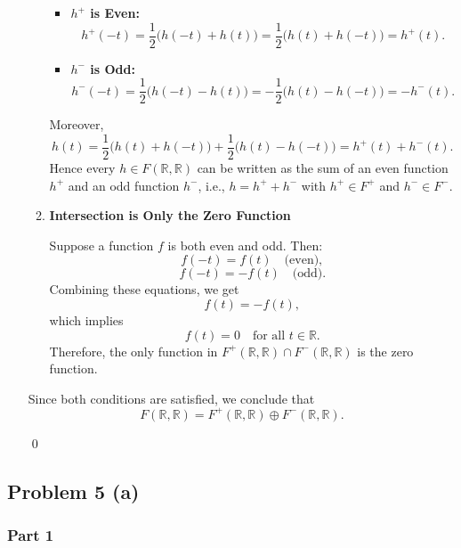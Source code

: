 \documentclass[12pt]{article}
\begin{document}
\begin{enumerate}[label=(\alph*)]
\begin{enumerate}[label=\arabic*.]
        \begin{itemize}
            \item \textbf{\(h^+\) is Even:}
            \[
                h^+(-t) = \frac{1}{2}\bigl(h(-t) + h(t)\bigr) = \frac{1}{2}\bigl(h(t) + h(-t)\bigr) = h^+(t).
            \]
            
            \item \textbf{\(h^-\) is Odd:}
            \[
                h^-(-t) = \frac{1}{2}\bigl(h(-t) - h(t)\bigr) = -\frac{1}{2}\bigl(h(t) - h(-t)\bigr) = -h^-(t).
            \]
        \end{itemize}
        
        Moreover,
        \[
            h(t) = \frac{1}{2}\bigl(h(t) + h(-t)\bigr) + \frac{1}{2}\bigl(h(t) - h(-t)\bigr) = h^+(t) + h^-(t).
        \]
        Hence every \(h \in F(\mathbb{R}, \mathbb{R})\) can be written as the sum of an even function \(h^+\) and an odd function \(h^-\), i.e., \(h = h^+ + h^-\) with \(h^+ \in F^+\) and \(h^- \in F^-\).
        
        \item \textbf{Intersection is Only the Zero Function}
        
        Suppose a function \(f\) is both even and odd. Then:
        \[
            f(-t) = f(t) \quad \text{(even)},
        \]
        \[
            f(-t) = -f(t) \quad \text{(odd)}.
        \]
        Combining these equations, we get
        \[
            f(t) = -f(t),
        \]
        which implies
        \[
            f(t) = 0 \quad \text{for all } t \in \mathbb{R}.
        \]
        Therefore, the only function in \(F^+(\mathbb{R}, \mathbb{R}) \cap F^-(\mathbb{R}, \mathbb{R})\) is the zero function.
    \end{enumerate}
    
    Since both conditions are satisfied, we conclude that
    \[
        F(\mathbb{R}, \mathbb{R}) = F^+(\mathbb{R}, \mathbb{R}) \oplus F^-(\mathbb{R}, \mathbb{R}).
    \]

    \qed
\end{enumerate}


\newpage

\subsection*{Problem 5 (a)}

\subsubsection*{Part 1}
\end{document}
